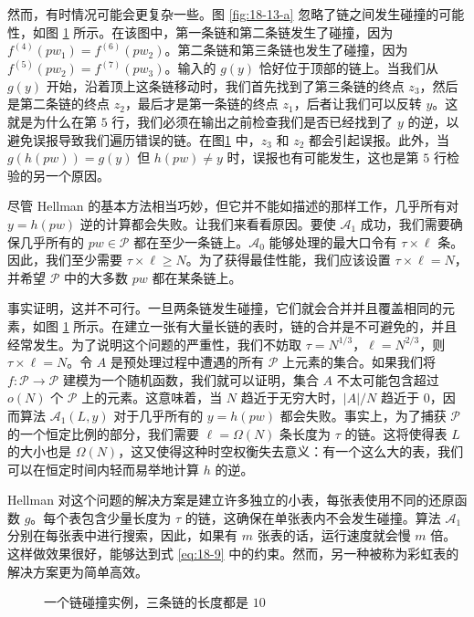 \begin{snote}
然而，有时情况可能会更复杂一些。图 \ref{fig:18-13-a} 忽略了链之间发生碰撞的可能性，如图 \ref{fig:18-14} 所示。在该图中，第一条链和第二条链发生了碰撞，因为 $f^{(4)}(pw_1)=f^{(6)}(pw_2)$。第二条链和第三条链也发生了碰撞，因为 $f^{(5)}(pw_2)=f^{(7)}(pw_3)$。输入的 $g(y)$ 恰好位于顶部的链上。当我们从 $g(y)$ 开始，沿着顶上这条链移动时，我们首先找到了第三条链的终点 $z_3$，然后是第二条链的终点 $z_2$，最后才是第一条链的终点 $z_1$，后者让我们可以反转 $y$。这就是为什么在第 $5$ 行，我们必须在输出之前检查我们是否已经找到了 $y$ 的逆，以避免误报导致我们遍历错误的链。在图\ref{fig:18-14} 中，$z_3$ 和 $z_2$ 都会引起误报。此外，当 $g(h(pw))=g(y)$ 但 $h(pw)\neq y$ 时，误报也有可能发生，这也是第 $5$ 行检验的另一个原因。
\end{snote}

\begin{snote}[链合并问题。]
尽管 Hellman 的基本方法相当巧妙，但它并不能如描述的那样工作，几乎所有对 $y=h(pw)$ 逆的计算都会失败。让我们来看看原因。要使 $\mathcal{A}_1$ 成功，我们需要确保几乎所有的 $pw\in\mathcal{P}$ 都在至少一条链上。$\mathcal{A}_0$ 能够处理的最大口令有 $\tau\times\ell$ 条。因此，我们至少需要 $\tau\times\ell\geq N$。为了获得最佳性能，我们应该设置 $\tau\times\ell=N$，并希望 $\mathcal{P}$ 中的大多数 $pw$ 都在某条链上。

事实证明，这并不可行。一旦两条链发生碰撞，它们就会合并并且覆盖相同的元素，如图 \ref{fig:18-14} 所示。在建立一张有大量长链的表时，链的合并是不可避免的，并且经常发生。为了说明这个问题的严重性，我们不妨取 $\tau=N^{1/3}$，$\ell=N^{2/3}$，则 $\tau\times\ell=N$。令 $A$ 是预处理过程中遭遇的所有 $\mathcal{P}$ 上元素的集合。如果我们将 $f:\mathcal{P}\to\mathcal{P}$ 建模为一个随机函数，我们就可以证明，集合 $A$ 不太可能包含超过 $o(N)$ 个 $\mathcal{P}$ 上的元素。这意味着，当 $N$ 趋近于无穷大时，$|A|/N$ 趋近于 $0$，因而算法 $\mathcal{A}_1(L,y)$ 对于几乎所有的 $y=h(pw)$ 都会失败。事实上，为了捕获 $\mathcal{P}$ 的一个恒定比例的部分，我们需要 $\ell=\Omega(N)$ 条长度为 $\tau$ 的链。这将使得表 $L$ 的大小也是 $\Omega(N)$，这又使得这种时空权衡失去意义：有一个这么大的表，我们可以在恒定时间内轻而易举地计算 $h$ 的逆。

Hellman 对这个问题的解决方案是建立许多独立的小表，每张表使用不同的还原函数 $g$。每个表包含少量长度为 $τ$ 的链，这确保在单张表内不会发生碰撞。算法 $\mathcal{A}_1$ 分别在每张表中进行搜索，因此，如果有 $m$ 张表的话，运行速度就会慢 $m$ 倍。这样做效果很好，能够达到式 \ref{eq:18-9} 中的约束。然而，另一种被称为彩虹表的解决方案更为简单高效。
\end{snote}

\begin{figure}
  \centering
  
  \caption{一个链碰撞实例，三条链的长度都是 $10$}
  \label{fig:18-14}
\end{figure}

